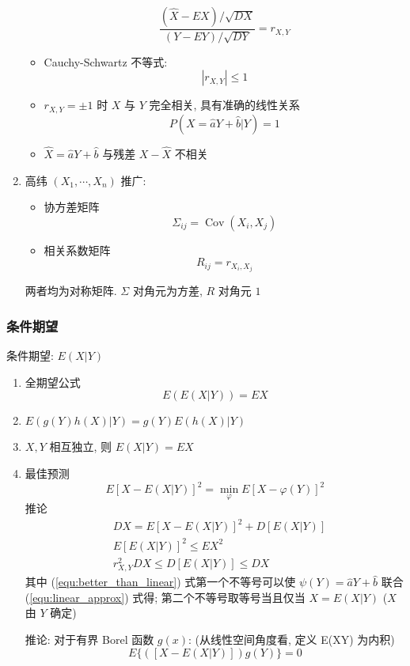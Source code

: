 \documentclass[11pt,a4paper,twocolumn]{article} %
\numberwithin{equation}{section} %
\DeclareMathOperator\cov{Cov}
\begin{document}
\begin{enumerate}
\begin{itemize}
\begin{equation}
			\frac{(\hat X-EX)/\sqrt{DX}}{(Y-EY)/\sqrt{DY}} = r_{X,Y}
		\end{equation}
		\item  Cauchy-Schwartz 不等式:
		\begin{equation}
			|r_{X,Y}|\le 1
		\end{equation}
		\item $r_{X,Y} = \pm 1$ 时 $X$ 与 $Y$ 完全相关, 具有准确的线性关系
		$$
		P(X = \hat a Y + \hat b | Y) = 1
		$$
		\item $\hat X = \hat a Y + \hat b$ 与残差 $X- \hat X$ 不相关
	\end{itemize}
	\item 高纬 $(X_1, \cdots, X_n)$ 推广: 
	\begin{itemize}
		\item 协方差矩阵
		\begin{equation}
			\Sigma_{ij} = \cov(X_i, X_j)
		\end{equation}
		\item 相关系数矩阵
		\begin{equation}
			R_{ij} = r_{X_i, X_j}
		\end{equation}
	\end{itemize}
	两者均为对称矩阵. $\Sigma$ 对角元为方差, $R$ 对角元 $1$
\end{enumerate}
\subsubsection{条件期望} %
\label{ssub:exptation_with_condition}
条件期望: $E(X|Y)$
\begin{enumerate}
	\item 全期望公式
	\begin{equation}
		E(E(X|Y)) = EX
	\end{equation}
	\item $E(g(Y)h(X)|Y) = g(Y)E(h(X)|Y)$
	\item $X, Y$ 相互独立, 则 $E(X|Y) = EX$
	\item 最佳预测
	\begin{equation}
		E[X - E(X|Y)]^2 = \min_\varphi E[X - \varphi(Y)]^2
	\end{equation}
	推论
	\begin{align}
		& DX = E[X - E(X|Y)]^2 + D[E(X|Y)]\\
		& E[E(X|Y)]^2 \le EX^2 \\
		& r_{X,Y}^2 DX\le D[E(X|Y)] \le DX \label{equ:better_than_linear}
	\end{align}
	其中 (\ref{equ:better_than_linear}) 式第一个不等号可以使 
	$\psi(Y) = \hat a Y + \hat b$ 联合 (\ref{equ:linear_approx}) 式得; 
	第二个不等号取等号当且仅当 $X = E(X|Y)$ ($X$ 由 $Y$ 确定)

	推论: 对于有界 Borel 函数 $g(x)$: (从线性空间角度看, 定义 E(XY) 为内积)
	\begin{equation}
		E\{([X-E(X|Y)])g(Y)\} = 0
	\end{equation}
\end{enumerate}
\end{document}
